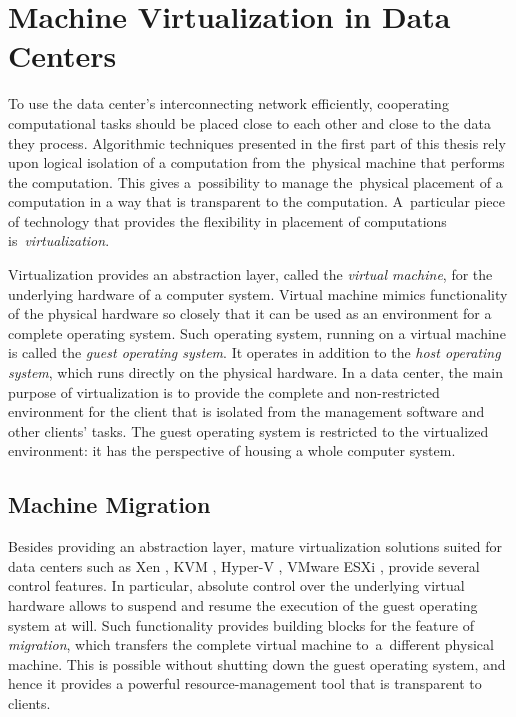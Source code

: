 \section{Machine Virtualization in Data Centers}
\label{sec:intro-machine-virtualization}

To use the data center's interconnecting network efficiently, cooperating computational tasks should be placed close to each other and close to the data they process.
Algorithmic techniques presented in the first part of this thesis rely upon logical isolation of a computation from the~physical machine that performs the computation.
This gives a~possibility to manage the~physical placement of a computation in a way that is transparent to the computation.
A~particular piece of technology that provides the flexibility in placement of computations is~\emph{virtualization}.

Virtualization provides an abstraction layer, called the \emph{virtual machine}, for the underlying hardware of a computer system.
Virtual machine mimics functionality of the physical hardware so closely that it can be used as an environment for a complete operating system.
Such operating system, running on a virtual machine is called the \emph{guest
operating system}. It operates in addition to the \emph{host operating
system}, which runs directly on the physical hardware. 
In a data center, the main purpose of virtualization is to provide the complete and non-restricted environment for the client that is isolated from the management software and other clients' tasks.
The guest operating system is restricted to the virtualized environment: it has the perspective of housing a whole computer system.


\subsection{Machine Migration}

Besides providing an abstraction layer, mature virtualization solutions suited for data centers such as Xen
\cite{url-xen}, KVM \cite{url-kvm}, Hyper-V \cite{url-hyperv}, VMware ESXi
\cite{url-vmware}, provide several control features.
In particular, absolute control over the underlying virtual hardware allows to suspend and resume the execution of the guest operating system at will.
Such functionality provides building blocks for the feature of \emph{migration}, which transfers the complete virtual machine to~a~different physical machine.
This is possible without shutting down the guest operating system, and hence it provides a powerful resource-management tool that is transparent to clients.


